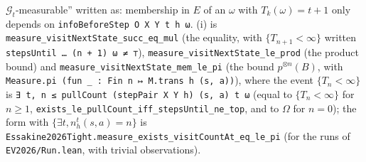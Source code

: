 \begin{remark}
$\mathcal G_t$-measurable'' written as: membership in $E$ of an $\omega$ with $T_k(\omega) = t + 1$ only
depends on \texttt{infoBeforeStep O X Y t h ω}. (i) is \texttt{measure\_visitNextState\_succ\_eq\_mul}
(the equality, with $\{T_{n+1} < \infty\}$ written \texttt{stepsUntil … (n + 1) ω ≠ ⊤}),
\texttt{measure\_visitNextState\_le\_prod} (the product bound) and
\texttt{measure\_visitNextState\_mem\_le\_pi} (the bound $p^{\otimes n}(B)$, with
\texttt{Measure.pi (fun \_ : Fin n ↦ M.trans h (s, a))}), where the event $\{T_n < \infty\}$ is
\texttt{∃ t, n ≤ pullCount (stepPair X Y h) (s, a) t ω} (equal to $\{T_n < \infty\}$ for $n \ge 1$,
\texttt{exists\_le\_pullCount\_iff\_stepsUntil\_ne\_top}, and to $\Omega$ for $n = 0$); the form with
$\{\exists t, n^t_h(s,a) = n\}$ is \texttt{Essakine2026Tight.measure\_exists\_visitCountAt\_eq\_le\_pi}
(for the runs of \texttt{EV2026/Run.lean}, with trivial observations).
\end{remark}
